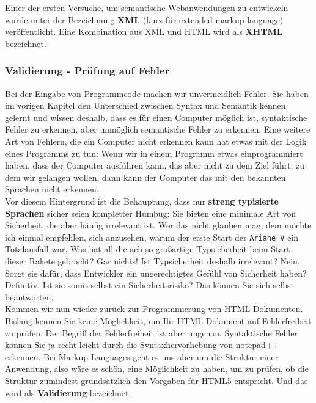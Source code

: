 Einer der ersten Versuche, um semantische Webanwendungen zu entwickeln wurde unter der Bezeichnung \textbf{XML} (kurz für extended markup language) veröffentlicht. Eine Kombination aus XML und HTML wird als \textbf{XHTML} bezeichnet.

\subsubsection{Validierung - Prüfung auf Fehler}

Bei der Eingabe von Programmcode machen wir unvermeidlich Fehler. Sie haben im vorigen Kapitel den Unterschied zwischen Syntax und Semantik kennen gelernt und wissen deshalb, dass es für einen Computer möglich ist, syntaktische Fehler zu erkennen, aber unmöglich semantische Fehler zu erkennen. Eine weitere Art von Fehlern, die ein Computer nicht erkennen kann hat etwas mit der Logik eines Programms zu tun: Wenn wir in einem Programm etwas einprogrammiert haben, dass der Computer ausführen kann, das aber nicht zu dem Ziel führt, zu dem wir gelangen wollen, dann kann der Computer das mit den bekannten Sprachen nicht erkennen.\\

Vor diesem Hintergrund ist die Behauptung, dass nur \textbf{streng typisierte Sprachen} sicher seien kompletter Humbug: Sie bieten eine minimale Art von Sicherheit, die aber häufig irrelevant ist. Wer das nicht glauben mag, dem möchte ich einmal empfehlen, sich anzusehen, warum der erste Start der \verb|Ariane V| ein Totalausfall war. Was hat all die ach so großartige Typsicherheit beim Start dieser Rakete gebracht? Gar nichts! Ist Typsicherheit deshalb irrelevant? Nein. Sorgt sie dafür, dass Entwickler ein ungerechtigtes Gefühl von Sicherheit haben? Definitiv. Ist sie somit selbst ein Sicherheitsrisiko? Das können Sie sich selbst beantworten.\\

Kommen wir nun wieder zurück zur Programmierung von HTML-Dokumenten. Bislang kennen Sie keine Möglichkeit, um Ihr HTML-Dokument auf Fehlerfreiheit zu prüfen. Der Begriff der Fehlerfreiheit ist aber ungenau. Syntaktische Fehler können Sie ja recht leicht durch die Syntaxhervorhebung von notepad++ erkennen. Bei Markup Languages geht es uns aber um die Struktur einer Anwendung, also wäre es schön, eine Möglichkeit zu haben, um zu prüfen, ob die Struktur zumindest grundsätzlich den Vorgaben für HTML5 entspricht. Und das wird als \textbf{Validierung} bezeichnet.\\

